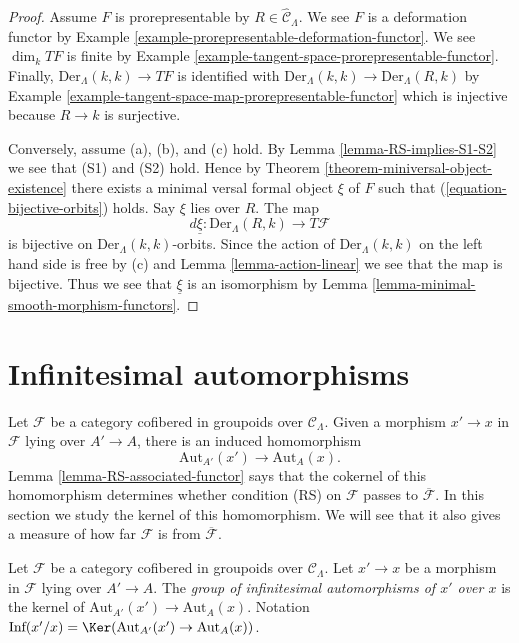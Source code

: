 \begin{proof}
Assume $F$ is prorepresentable by $R \in \widehat{\mathcal{C}}_\Lambda$.
We see $F$ is a deformation functor by
Example \ref{example-prorepresentable-deformation-functor}.
We see $\dim_k TF$ is finite by
Example \ref{example-tangent-space-prorepresentable-functor}.
Finally, $\text{Der}_\Lambda(k, k) \to TF$ is identified with
$\text{Der}_\Lambda(k, k) \to \text{Der}_\Lambda(R, k)$ by
Example \ref{example-tangent-space-map-prorepresentable-functor}
which is injective because $R \to k$ is surjective.

\medskip\noindent
Conversely, assume (a), (b), and (c) hold. By
Lemma \ref{lemma-RS-implies-S1-S2}
we see that (S1) and (S2) hold. Hence by
Theorem \ref{theorem-miniversal-object-existence}
there exists a minimal versal formal object $\xi$ of $F$ such that
(\ref{equation-bijective-orbits}) holds. Say $\xi$ lies over $R$.
The map
$$
d\underline{\xi} : \text{Der}_\Lambda(R, k) \to T\mathcal{F}
$$
is bijective on $\text{Der}_\Lambda(k, k)$-orbits. Since the action
of $\text{Der}_\Lambda(k, k)$ on the left hand side is free by (c) and
Lemma \ref{lemma-action-linear}
we see that the map is bijective. Thus we see that $\underline{\xi}$
is an isomorphism by
Lemma \ref{lemma-minimal-smooth-morphism-functors}.
\end{proof}




\section{Infinitesimal automorphisms}
\label{section-infinitesimal-automorphisms}

\noindent
Let $\mathcal{F}$ be a category cofibered in groupoids over
$\mathcal{C}_\Lambda$. Given a morphism $x' \to x$ in $\mathcal{F}$ lying over
$A' \to A$, there is an induced homomorphism
$$
\text{Aut}_{A'}(x') \to \text{Aut}_A(x).
$$
Lemma \ref{lemma-RS-associated-functor}
says that the cokernel of this homomorphism determines whether
condition (RS) on $\mathcal{F}$ passes to $\overline{\mathcal{F}}$.
In this section we study the kernel of this homomorphism. We will see
that it also gives a measure of how far $\mathcal{F}$
is from $\overline{\mathcal{F}}$.

\begin{definition}
\label{definition-relative-infinitesimal-auts}
Let $\mathcal{F}$ be a category cofibered in groupoids over $\mathcal
C_\Lambda$. Let $x' \to x$ be a morphism in $\mathcal{F}$ lying over
$A' \to A$. The {\it group of infinitesimal automorphisms
of $x'$ over $x$} is the kernel of
$\text{Aut}_{A'}(x') \to \text{Aut}_A(x)$.
Notation
$\text{Inf}(x'/x) = \Ker(\text{Aut}_{A'}(x') \to \text{Aut}_A(x))$.
\end{definition}

